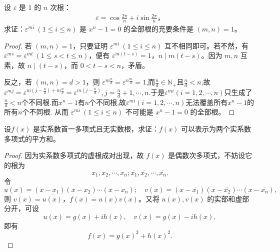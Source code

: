 \documentclass[../../main.tex]{subfiles}
\begin{document}
\begin{example}
设 $\varepsilon$ 是 1 的 $n$ 次根：
\begin{align*}
\varepsilon = \cos \frac{2\pi}{n} + i \sin \frac{2\pi}{n}，
\end{align*}
求证：$\varepsilon^{mi} \ (1 \leq i \leq n)$ 是 $x^n - 1 = 0$ 的全部根的充要条件是 $(m, n) = 1$。
\end{example}
\begin{proof}
若 $(m, n) = 1$，只要证明 $\varepsilon^{mi} \ (1 \leq i \leq n)$ 互不相同即可。若不然，有 $\varepsilon^{ms} = \varepsilon^{mt} \ (1 \leq s < t \leq n)$，便有 $\varepsilon^{m(t-s)} = 1$，$n \mid m(t-s)$。因为 $m, n$ 互素，故 $n \mid (t-s)$，而 $0 < t-s < n$，矛盾。

反之，若 $(m, n) = d > 1$，则 $\varepsilon^{m \frac{n}{d}} = \varepsilon^{n \frac{m}{d}} = 1$,而$\frac{n}{d}\in \mathbb{N}_+$且$\frac{n}{d}<n$,故$\varepsilon ^{mj}=\varepsilon ^{m\left( j-\frac{n}{d} \right) +m\frac{n}{d}}=\varepsilon ^{m\left( j-\frac{n}{d} \right)},j=\frac{n}{d}+1,\cdots ,n.$于是$\varepsilon ^{mi}\left( i=1,2,\cdots ,n \right) $只生成了$\frac{n}{d}<n$个不同根.而$x^n-1$有$n$个不同根,故$\varepsilon ^{mi}\left( i=1,2,\cdots ,n \right)$无法覆盖所有$x^n-1$的所有$n$个不同根.
从而 $\varepsilon^{mi} \ (1 \leq i \leq n)$ 不可能是 $x^n - 1 = 0$ 的全部根。
\end{proof}

\begin{proposition}
设\( f(x) \) 是实系数首一多项式且无实数根，求证：\( f(x) \) 可以表示为两个实系数多项式的平方和。
\end{proposition}
\begin{proof}
因为实系数多项式的虚根成对出现，故 \( f(x) \) 是偶数次多项式，不妨设它的根为
\[
x_1, x_2, \cdots, x_n; \overline{x_1}, \overline{x_2}, \cdots, \overline{x_n}.
\]
令
\[
u(x) = (x - x_1)(x - x_2) \cdots (x - x_n); \quad v(x) = (x - \overline{x_1})(x - \overline{x_2}) \cdots (x - \overline{x_n}),
\]
则 \( v(x) = \overline{u(x)} \)，\( f(x) = u(x)v(x) \)。又将 \( u(x), v(x) \) 的实部和虚部分开，可设
\[
u(x) = g(x) + ih(x), \quad v(x) = g(x) - ih(x),
\]
即有
\[
f(x) = g(x)^2 + h(x)^2.
\]
\end{proof}
\end{document}
